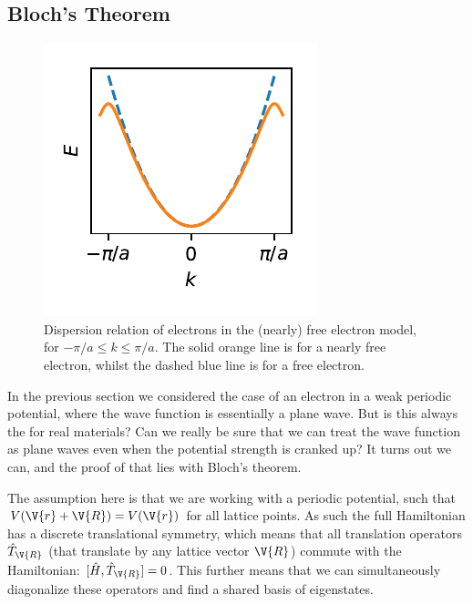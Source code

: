 \documentclass[main.tex]{subfiles}
\begin{document}
	\subsection{Bloch's Theorem}
	\begin{figure}
		\begin{center}
			\includegraphics[width=\linewidth]{figures/nearly_free.pdf}
		\end{center}
		\caption{Dispersion relation of electrons in the (nearly) free electron model, for $ -\pi/a \leq k \leq \pi/a $. The solid orange line is for a nearly free electron, whilst the dashed blue line is for a free electron.}
		\label{fig:nearly_free}
	\end{figure}
	In the previous section we considered the case of an electron in a weak periodic potential, where the wave function is essentially a plane wave. But is this always the for real materials? Can we really be sure that we can treat the wave function as plane waves even when the potential strength is cranked up? It turns out we can, and the proof of that lies with Bloch's theorem.
	
	The assumption here is that we are working with a periodic potential, such that $ V(\V{r} + \V{R}) = V(\V{r}) $ for all lattice points. As such the full Hamiltonian has a discrete translational symmetry, which means that all translation operators $ \hat{T}_{\V{R}} $ (that translate by any lattice vector $ \V{R} $) commute with the Hamiltonian: $ [\hat{H}, \hat{T}_{\V{R}}] = 0$. This further means that we can simultaneously diagonalize these operators and find a shared basis of eigenstates.
	
\end{document}
